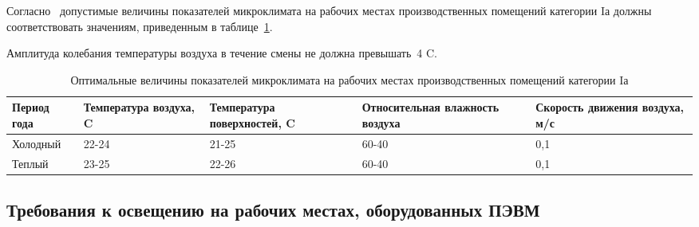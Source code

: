  Согласно~\cite{sanpin_mikroclimate} допустимые величины показателей микроклимата на рабочих местах производственных помещений категории Iа 
 должны соответствовать значениям, приведенным в таблице~\ref{tab:climate_1}. 
 
 Амплитуда колебания температуры воздуха в течение смены не должна превышать~4\textdegree{} C.
 
\begin{table}[h!]
\caption{ Оптимальные величины показателей микроклимата на рабочих местах производственных помещений категории Iа }
\label{tab:climate_1}
\begin{center}
\begin{tabularx}{\linewidth}{|X|X|X|X|X|}
\hline
Период года & Температура воздуха, \textdegree{}C & Температура поверхностей, \textdegree{}C & Относительная влажность воздуха & Скорость движения воздуха, м/с\\
\hline
Холодный & 22-24 & 21-25 & 60-40 & 0,1\\
\hline
Теплый & 23-25 & 22-26 & 60-40 & 0,1\\
\hline
\end{tabularx}
\end{center}
\end{table}


\subsection{Требования к освещению на рабочих местах, оборудованных ПЭВМ}

